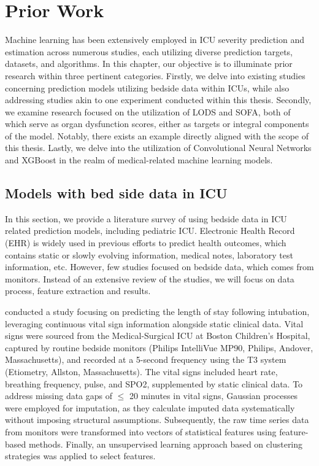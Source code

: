 \documentclass[12pt,a4paper,english
]{tunithesis}
\begin{document}
\chapter{Prior Work}
\label{ch:priorwork}
Machine learning has been extensively employed in ICU severity prediction and estimation across numerous studies, each utilizing diverse prediction targets, datasets, and algorithms. In this chapter, our objective is to illuminate prior research within three pertinent categories. Firstly, we delve into existing studies concerning prediction models utilizing bedside data within ICUs, while also addressing studies akin to one experiment conducted within this thesis. Secondly, we examine research focused on the utilization of LODS and SOFA, both of which serve as organ dysfunction scores, either as targets or integral components of the model. Notably, there exists an example directly aligned with the scope of this thesis. Lastly, we delve into the utilization of Convolutional Neural Networks and XGBoost in the realm of medical-related machine learning models. 

\section{Models with bed side data in ICU}
In this section, we provide a literature survey of using bedside data in ICU related prediction models, including pediatric ICU. Electronic Health Record (EHR) is widely used in previous efforts to predict health outcomes, which contains static or slowly evolving information, medical notes, laboratory test information, etc. However, few studies focused on bedside data, which comes from monitors. Instead of an extensive review of the studies, we will focus on data process, feature extraction and results.

\textcite{mitdavid2020} conducted a study focusing on predicting the length of stay following intubation, leveraging continuous vital sign information alongside static clinical data. Vital signs were sourced from the Medical-Surgical ICU at Boston Children's Hospital, captured by routine bedside monitors (Philips IntelliVue MP90, Philips, Andover, Massachusetts), and recorded at a 5-second frequency using the T3 system (Etiometry, Allston, Massachusetts). The vital signs included heart rate, breathing frequency, pulse, and SPO2, supplemented by static clinical data. To address missing data gaps of $\leq$ 20 minutes in vital signs, Gaussian processes were employed for imputation, as they calculate imputed data systematically without imposing structural assumptions. Subsequently, the raw time series data from monitors were transformed into vectors of statistical features using feature-based methods. Finally, an unsupervised learning approach based on clustering strategies was applied to select features. 
\end{document}

